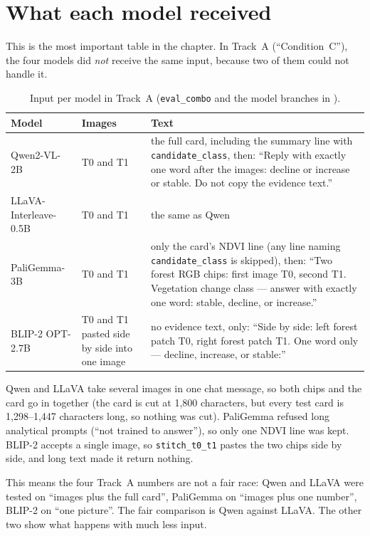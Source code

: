 \section{What each model received}
\label{sec:inputs}

This is the most important table in the chapter. In Track~A (``Condition~C''), the four models did \emph{not} receive the same input, because two of them could not handle it.

\begin{table}[H]
\centering
\caption{Input per model in Track~A (\texttt{eval\_combo} and the model branches in ).}
\label{tab:inputs}
\small
\begin{tabularx}{\textwidth}{L{2.9cm}L{2.6cm}Y}
\toprule
Model & Images & Text \\
\midrule
Qwen2-VL-2B & T0 and T1 & the full card, including the summary line with \texttt{candidate\_class}, then: ``Reply with exactly one word after the images: decline or increase or stable. Do not copy the evidence text.'' \\
LLaVA-Interleave-0.5B & T0 and T1 & the same as Qwen \\
PaliGemma-3B & T0 and T1 & only the card's NDVI line (any line naming \texttt{candidate\_class} is skipped), then: ``Two forest RGB chips: first image T0, second T1. Vegetation change class --- answer with exactly one word: stable, decline, or increase.'' \\
BLIP-2 OPT-2.7B & T0 and T1 pasted side by side into one image & no evidence text, only: ``Side by side: left forest patch T0, right forest patch T1. One word only --- decline, increase, or stable:'' \\
\bottomrule
\end{tabularx}
\end{table}

\begin{whybox}
Qwen and LLaVA take several images in one chat message, so both chips and the card go in together (the card is cut at 1,800 characters, but every test card is 1,298--1,447 characters long, so nothing was cut). PaliGemma refused long analytical prompts (``not trained to answer''), so only one NDVI line was kept. BLIP-2 accepts a single image, so \texttt{stitch\_t0\_t1} pastes the two chips side by side, and long text made it return nothing.
\end{whybox}

\begin{plainwords}
This means the four Track~A numbers are not a fair race: Qwen and LLaVA were tested on ``images plus the full card'', PaliGemma on ``images plus one number'', BLIP-2 on ``one picture''. The fair comparison is Qwen against LLaVA. The other two show what happens with much less input.
\end{plainwords}

